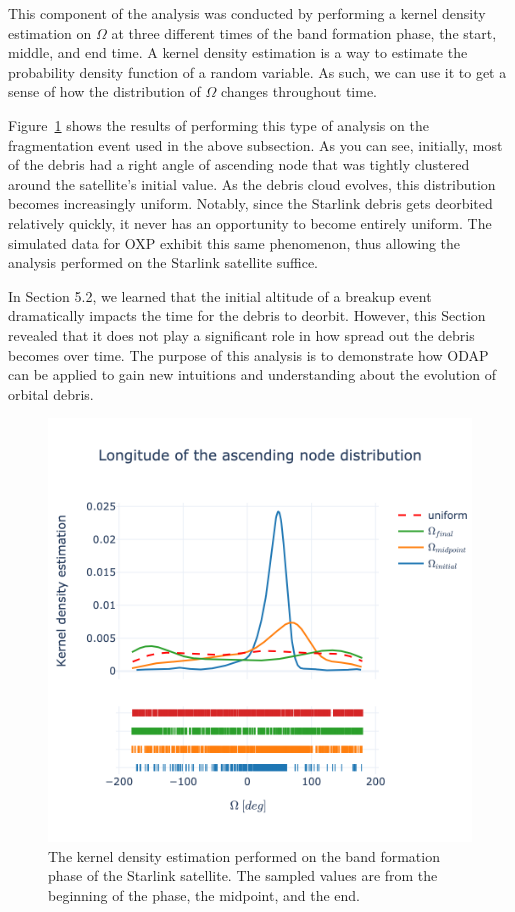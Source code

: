 \documentclass[a4paper, 12pt]{article}
\begin{document}
This component of the analysis was conducted by performing a kernel density estimation on $\Omega$ at three different times of the band formation phase, the start, middle, and end time. A kernel density estimation is a way to estimate the probability density function of a random variable. As such, we can use it to get a sense of how the distribution of $\Omega$ changes throughout time. 

Figure~\ref{fig:starlink_dist} shows the results of performing this type of analysis on the fragmentation event used in the above subsection. As you can see, initially, most of the debris had a right angle of ascending node that was tightly clustered around the satellite's initial value. As the debris cloud evolves, this distribution becomes increasingly uniform. Notably, since the Starlink debris gets deorbited relatively quickly, it never has an opportunity to become entirely uniform. The simulated data for OXP exhibit this same phenomenon, thus allowing the analysis performed on the Starlink satellite suffice.

\newpage
In Section 5.2, we learned that the initial altitude of a breakup event dramatically impacts the time for the debris to deorbit. However, this Section revealed that it does not play a significant role in how spread out the debris becomes over time. The purpose of this analysis is to demonstrate how ODAP can be applied to gain new intuitions and understanding about the evolution of orbital debris.

\begin{figure}[t!]
	\centering
	\includegraphics[scale=0.4, trim={0 0 0 2cm},clip]{starlink_dist}
	\caption{The kernel density estimation performed on the band formation phase of the Starlink satellite. The sampled values are from the beginning of the phase, the midpoint, and the end.}
	\label{fig:starlink_dist}
\end{figure}
\end{document}
